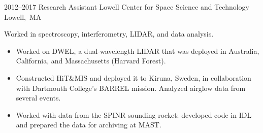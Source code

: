 \documentclass[letterpaper,sans]{moderncv}
\begin{document}
        \cventry%
            {2012--2017}
            {Research Assistant}
            {Lowell Center for Space Science and Technology}
            {\mbox{Lowell, MA}}
            {}
            {%
                Worked in spectroscopy, interferometry,
                LIDAR, and data analysis.
                \begin{itemize}
                    \item
                        Worked on DWEL, a dual-wavelength LIDAR that was
                        deployed in Australia, California, and
                        Massachusetts (Harvard Forest).
                    \item
                        Constructed HiT\&MIS and deployed it to Kiruna,
                        Sweden, in collaboration with Dartmouth College's
                        BARREL mission. Analyzed airglow data from
                        several events.
                    \item
                        Worked with data from the SPINR sounding rocket:
                        developed code in IDL and prepared the data for
                        archiving at MAST.
                \end{itemize}%
             }
\end{document}
